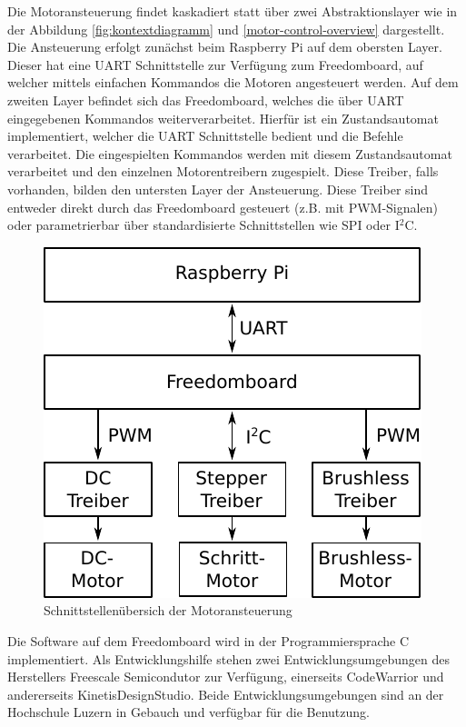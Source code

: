 Die Motoransteuerung findet kaskadiert statt über zwei Abstraktionslayer
wie in der Abbildung \ref{fig:kontextdiagramm} und 
\ref{motor-control-overview} dargestellt. Die Ansteuerung erfolgt zunächst
beim Raspberry Pi auf dem obersten Layer. Dieser hat eine UART
Schnittstelle zur Verfügung zum Freedomboard, auf welcher mittels
einfachen Kommandos die Motoren angesteuert werden. 
%
Auf dem zweiten Layer befindet sich das Freedomboard, welches die über UART
eingegebenen Kommandos weiterverarbeitet. Hierfür ist ein Zustandsautomat
implementiert, welcher die UART Schnittstelle bedient und die Befehle
verarbeitet.
%
Die eingespielten Kommandos werden mit diesem Zustandsautomat verarbeitet und
den einzelnen Motorentreibern zugespielt. Diese Treiber, falls vorhanden,
bilden den untersten Layer der Ansteuerung. Diese Treiber sind entweder
direkt durch das Freedomboard gesteuert (z.B. mit PWM-Signalen) oder 
parametrierbar über standardisierte Schnittstellen wie SPI oder I$^2$C.

\begin{figure}[h!]
	\centering
	\includegraphics[scale=1]{../../fig/motor-control-overview.pdf}
	\caption{Schnittstellenübersich der Motoransteuerung}
	\label{fig:motor-control-overview}
\end{figure}

Die Software auf dem Freedomboard wird in der Programmiersprache C
implementiert. Als Entwicklungshilfe stehen zwei Entwicklungsumgebungen
des Herstellers Freescale Semicondutor zur Verfügung, einerseits CodeWarrior
und andererseits KinetisDesignStudio. Beide Entwicklungsumgebungen sind
an der Hochschule Luzern in Gebauch und verfügbar für die Benutzung.
